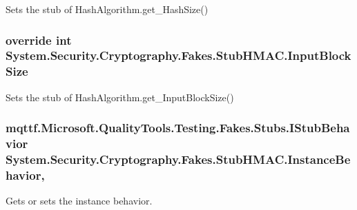 Sets the stub of Hash\-Algorithm.\-get\-\_\-\-Hash\-Size()

\hypertarget{class_system_1_1_security_1_1_cryptography_1_1_fakes_1_1_stub_h_m_a_c_a2523ea708754e8a3bf9800d49350d656}{
\subsubsection[{Input\-Block\-Size}]{\setlength{\rightskip}{0pt plus 5cm}override int System.\-Security.\-Cryptography.\-Fakes.\-Stub\-H\-M\-A\-C.\-Input\-Block\-Size\hspace{0.3cm}{\ttfamily [get]}}}\label{class_system_1_1_security_1_1_cryptography_1_1_fakes_1_1_stub_h_m_a_c_a2523ea708754e8a3bf9800d49350d656}


Sets the stub of Hash\-Algorithm.\-get\-\_\-\-Input\-Block\-Size()

\hypertarget{class_system_1_1_security_1_1_cryptography_1_1_fakes_1_1_stub_h_m_a_c_afb1ed2ae8ecf11c9420e60ebc16f35ef}{
\subsubsection[{Instance\-Behavior}]{\setlength{\rightskip}{0pt plus 5cm}mqttf.\-Microsoft.\-Quality\-Tools.\-Testing.\-Fakes.\-Stubs.\-I\-Stub\-Behavior System.\-Security.\-Cryptography.\-Fakes.\-Stub\-H\-M\-A\-C.\-Instance\-Behavior\hspace{0.3cm}{\ttfamily [get]}, {\ttfamily [set]}}}\label{class_system_1_1_security_1_1_cryptography_1_1_fakes_1_1_stub_h_m_a_c_afb1ed2ae8ecf11c9420e60ebc16f35ef}


Gets or sets the instance behavior.

